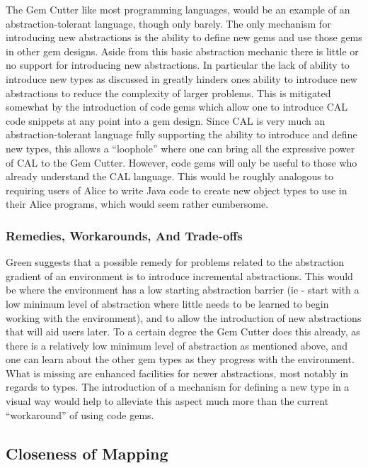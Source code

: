 The Gem Cutter like most programming languages, would be an example of an abstraction-tolerant language, though only barely.  The only mechanism for introducing new abstractions is the ability to define new gems and use those gems in other gem designs.  Aside from this basic abstraction mechanic there is little or no support for introducing new abstractions.  In particular the lack of ability to introduce new types as discussed in  greatly hinders ones ability to introduce new abstractions to reduce the complexity of larger problems.  This is mitigated somewhat by the introduction of code gems which allow one to introduce CAL code snippets at any point into a gem design.  Since CAL is very much an abstraction-tolerant language fully supporting the ability to introduce and define new types, this allows a ``loophole'' where one can bring all the expressive power of CAL to the Gem Cutter.  However, code gems will only be useful to those who already understand the CAL language.  This would be roughly analogous to requiring users of Alice to write Java code to create new object types to use in their Alice programs, which would seem rather cumbersome.

\subsubsection{Remedies, Workarounds, And Trade-offs}

Green suggests that a possible remedy for problems related to the abstraction gradient of an environment is to introduce incremental abstractions.  This would be where the environment has a low starting abstraction barrier (ie - start with a low minimum level of abstraction where little needs to be learned to begin working with the environment), and to allow the introduction of new abstractions that will aid users later.  To a certain degree the Gem Cutter does this already, as there is a relatively low minimum level of abstraction as mentioned above, and one can learn about the other gem types as they progress with the environment.  What is missing are enhanced facilities for newer abstractions, most notably in regards to types.  The introduction of a mechanism for defining a new type in a visual way would help to alleviate this aspect much more than the current ``workaround'' of using code gems.


\subsection{Closeness of Mapping}

